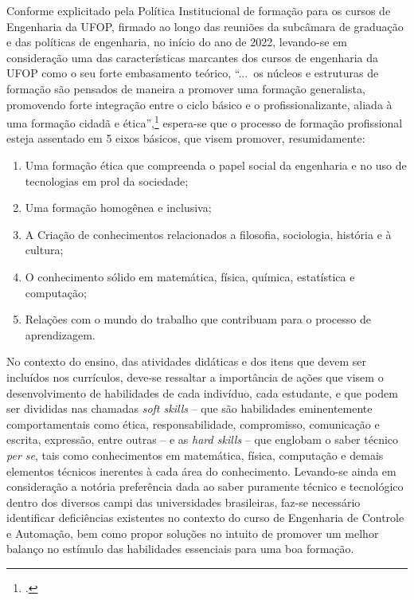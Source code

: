 \documentclass[
	12pt,				%
	openright,			%
	oneside,			%
	a4paper,			%
	english,			%
	brazil				%
	]{abntex2}
\begin{document}
Conforme explicitado pela Política Institucional de formação para os cursos de Engenharia da UFOP, firmado ao longo das reuniões da subcâmara de graduação e das políticas de engenharia, no início do ano de 2022, levando-se em consideração uma das características marcantes dos cursos de engenharia da UFOP como o seu forte embasamento teórico, ``...~os núcleos e estruturas de formação são pensados de maneira a promover uma formação generalista, promovendo forte integração entre o ciclo básico e o profissionalizante, aliada à uma formação cidadã e ética'',\footcite[p.~17]{politica-eng-2022-ufop} espera-se que o processo de formação profissional esteja assentado em 5 eixos básicos, que visem promover, resumidamente:
\begin{enumerate}
    \item Uma formação ética que compreenda o papel social da engenharia e no uso de tecnologias em prol da sociedade;
    \item Uma formação homogênea e inclusiva;
    \item A Criação de conhecimentos relacionados a filosofia, sociologia, história e à cultura;
    \item O conhecimento sólido em matemática, física, química, estatística e computação;
    \item Relações com o mundo do trabalho que contribuam para o processo de aprendizagem.
\end{enumerate}

No contexto do ensino, das atividades didáticas e dos itens que devem ser incluídos nos currículos, deve-se ressaltar a importância de ações que visem o desenvolvimento de habilidades de cada indivíduo, cada estudante, e que podem ser divididas nas chamadas \textit{soft skills} -- que são habilidades eminentemente comportamentais como ética, responsabilidade, compromisso, comunicação e escrita, expressão, entre outras -- e as \textit{hard skills} -- que englobam o saber técnico \emph{per se}, tais como conhecimentos em matemática, física, computação e demais elementos técnicos inerentes à cada área do conhecimento. Levando-se ainda em consideração a notória preferência dada ao saber puramente técnico e tecnológico dentro dos diversos campi das universidades brasileiras, faz-se necessário identificar deficiências existentes no contexto do curso de Engenharia de Controle e Automação, bem como propor soluções no intuito de promover um melhor balanço no estímulo das habilidades essenciais para uma boa formação.
\end{document}

